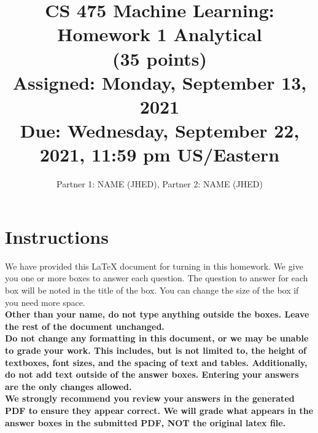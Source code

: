 \documentclass[11pt]{article}
\title{CS 475 Machine Learning: Homework 1 Analytical \\
(35 points)\\
\Large{Assigned: Monday, September 13, 2021} \\
\Large{Due: Wednesday, September 22, 2021, 11:59 pm US/Eastern}}
\author{Partner 1: NAME (JHED), Partner 2:  NAME (JHED)}
\date{}
\renewcommand{\vec}[1]{\mathbf{#1}}
\begin{document}
\maketitle
\thispagestyle{headings}

\section*{Instructions }
We have provided this \LaTeX{} document for turning in this homework. We give you one or more boxes to answer each question.  The question to answer for each box will be noted in the title of the box.  You can change the size of the box if you need more space.\\

{\bf Other than your name, do not type anything outside the boxes. Leave the rest of the document unchanged.}\\


\textbf{Do not change any formatting in this document, or we may be unable to
  grade your work. This includes, but is not limited to, the height of
  textboxes, font sizes, and the spacing of text and tables.  Additionally, do
  not add text outside of the answer boxes. Entering your answers are the only
  changes allowed.}\\


\textbf{We strongly recommend you review your answers in the generated PDF to
  ensure they appear correct. We will grade what appears in the answer boxes in
  the submitted PDF, NOT the original latex file.}

\end{document}
